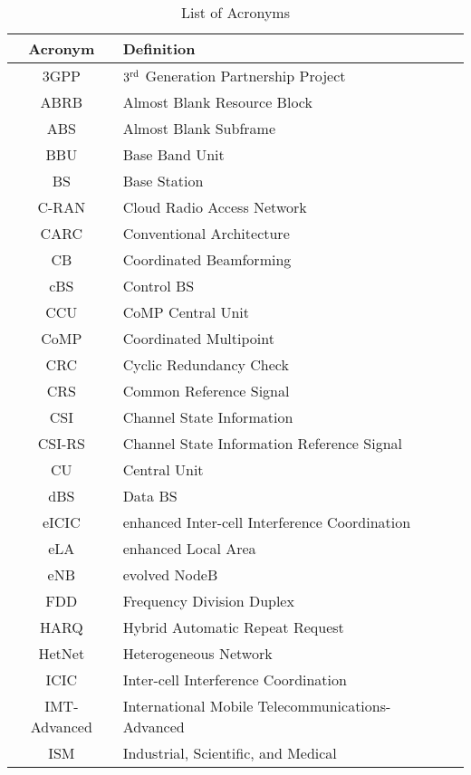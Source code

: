 \documentclass[article,10pt,twocolumn]{IEEEtran}
\begin{document}
\begin{table}[t]
\renewcommand{\arraystretch}{1.35}
    \centering
    \caption{List of Acronyms}\label{Table:tabnom}
    \vspace{2mm}
    \begin{tabular}{c||lc}
    	\hline
    	\textbf{Acronym}	&	\textbf{Definition}\\
    	\hline
    	3GPP	&	$3^{\textnormal{rd}}$ Generation Partnership Project\\
    	\hline
     	ABRB	&	Almost Blank Resource Block\\
    	\hline
	ABS	&	Almost Blank Subframe\\
    	\hline
	BBU	&	Base Band Unit\\
    	\hline
	BS	&	Base Station\\
    	\hline
	C-RAN&	Cloud Radio Access Network\\
    	\hline
	CARC	&	Conventional Architecture\\
    	\hline
	CB	&	Coordinated Beamforming\\
    	\hline
	cBS	&	Control BS\\
    	\hline
	CCU	&	CoMP Central Unit\\
    	\hline
	CoMP	&	Coordinated Multipoint\\
    	\hline
	CRC	&	Cyclic Redundancy Check\\
    	\hline
	CRS	&	Common Reference Signal\\
    	\hline
	CSI	&	Channel State Information\\
    	\hline
	CSI-RS&	Channel State Information Reference Signal\\
    	\hline
	CU	&	Central Unit\\
    	\hline
	dBS	&	Data BS\\
    	\hline
	eICIC	&	enhanced Inter-cell Interference Coordination\\
    	\hline
	eLA	&	enhanced Local Area\\
    	\hline
	eNB	&	evolved NodeB\\
    	\hline
	FDD	&	Frequency Division Duplex\\
    	\hline
	HARQ	&	Hybrid Automatic Repeat Request\\
    	\hline
	HetNet&	Heterogeneous Network\\
	\hline
	ICIC	&	Inter-cell Interference Coordination\\
    	\hline
	IMT-Advanced	&	International Mobile Telecommunications-Advanced\\
    	\hline
	ISM	&	Industrial, Scientific, and Medical\\

\end{tabular}
\end{table}
\end{document}
